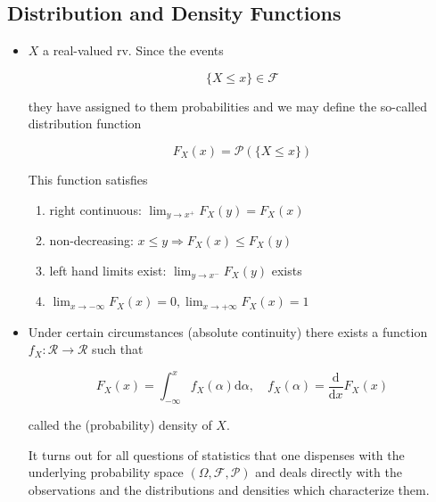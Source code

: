 \documentclass[12pt,thmsa]{article}
\begin{document}
\subsection{Distribution and Density Functions}
\begin{itemize}
	\item $X$ a real-valued rv. Since the events


	$$
	\{X \leq x\} \in \mathcal{F}
	$$
	
	they have assigned to them probabilities and we may define the so-called distribution function
	
	$$
	F_{X}(x)=\mathcal{P}(\{X \leq x\})
	$$
	
	This function satisfies
	
	\begin{enumerate}
		\item right continuous: $\lim _{y \rightarrow x^{+}} F_{X}(y)=F_{X}(x)$
		
		\item non-decreasing: $x \leq y \Longrightarrow F_{X}(x) \leq F_{X}(y)$
		
		\item left hand limits exist: $\lim _{y \rightarrow x^{-}} F_{X}(y)$ exists
		
		\item $\lim _{x \rightarrow-\infty} F_{X}(x)=0, \lim _{x \rightarrow+\infty} F_{X}(x)=1$
		
	\end{enumerate}


	\item Under certain circumstances (absolute continuity) there exists a function $f_{X}: \mathcal{R} \rightarrow \mathcal{R}$ such that


	$$
	F_{X}(x)=\int_{-\infty}^{x} f_{X}(\alpha) \mathrm{d} \alpha, \quad f_{X}(\alpha)=\frac{\mathrm{d}}{\mathrm{d} x} F_{X}(x)
	$$
	
	called the (probability) density of $X$.
	
	It turns out for all questions of statistics that one dispenses with the underlying probability space $(\Omega, \mathcal{F}, \mathcal{P})$ and deals directly with the observations and the distributions and densities which characterize them.
	
\end{itemize}

\end{document}
